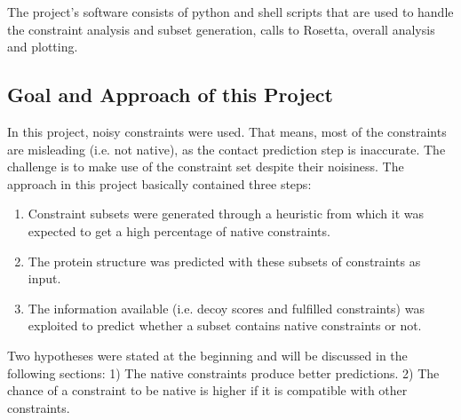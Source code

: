 \documentclass[a4paper, 11pt, parskip=half]{scrartcl}
\begin{document}
The project's software consists of python and shell scripts that are used to
handle the constraint analysis and subset generation,
calls to Rosetta, overall analysis and plotting.

\subsection{Goal and Approach of this Project}
\label{sec:GoalApp}

In this project, noisy constraints were used.
That means, most of the constraints are misleading (i.e. not native),
as the contact prediction step is inaccurate.
The challenge is to make use of the constraint set despite their noisiness.
The approach in this project basically contained three steps:
\begin{enumerate}

  \item Constraint subsets
  were generated through a heuristic from which it was expected to get
  a high percentage of native constraints.

  \item The protein structure was predicted with these subsets of constraints as input.

  \item The information available (i.e. decoy scores and fulfilled constraints)
  was exploited to predict whether a subset
  contains native constraints or not.
\end{enumerate}

Two hypotheses were stated at the beginning and will be discussed in the following sections:
1) The native constraints produce better predictions.
2) The chance of a constraint to be native is higher if it is compatible with other constraints.
\end{document}
